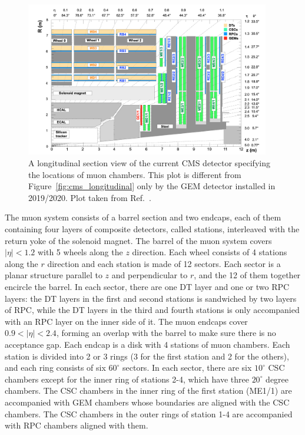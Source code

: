 \begin{figure}[!htb]
    \centering
    \captionsetup{justification=justified}
    \includegraphics[width=0.95\textwidth]{pics/LHC_CMS/muon_chambers.png}
    \caption{A longitudinal section view of the current CMS detector specifying the locations of muon chambers.
             This plot is different from Figure~\ref{fig:cms_longitudinal} only by the GEM detector installed in 2019/2020.
             Plot taken from Ref.~\cite{Colaleo:2021453}.}
    \label{fig:cms_muons}
\end{figure}


The muon system consists of a barrel section and two endcaps, each of them containing four layers of composite detectors, 
called stations, interleaved with the return yoke of the solenoid magnet.
The barrel of the muon system covers $|\eta| < 1.2$ with 5 wheels along the $z$ direction.
Each wheel consists of 4 stations along the $r$ direction and each station is made of 12 sectors.
Each sector is a planar structure parallel to $z$ and perpendicular to $r$, 
and the 12 of them together encircle the barrel.
In each sector, there are one DT layer and one or two RPC layers: the DT layers in the first and second stations is sandwiched by two layers of RPC,
while the DT layers in the third and fourth stations is only accompanied with an RPC layer on the inner side of it.
The muon endcaps cover $0.9 < |\eta| < 2.4$, forming an overlap with the barrel to make sure there is no acceptance gap.
Each endcap is a disk with 4 stations of muon chambers.
Each station is divided into 2 or 3 rings (3 for the first station and 2 for the others), and each ring consists of six $60^\circ$ sectors.
In each sector, there are six $10^\circ$ CSC chambers except for the inner ring of stations 2-4, which have three $20^\circ$ degree chambers.
The CSC chambers in the inner ring of the first station (ME1/1) are accompanied with GEM chambers whose boundaries are aligned with the CSC chambers.
The CSC chambers in the outer rings of station 1-4 are accompanied with RPC chambers aligned with them.

